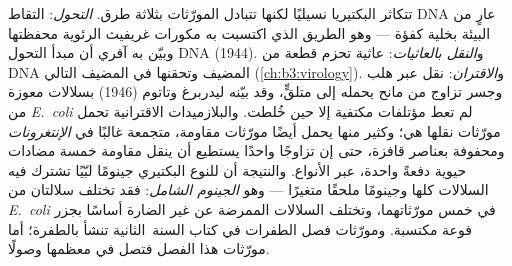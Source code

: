 \begin{definition}\label{def:b3:bacteriology:hgt}
تتكاثر البكتيريا نسيليًا لكنها تتبادل المورّثات بثلاثة طرق.
\emph{التحول}: التقاط DNA عارٍ من البيئة بخلية
كفؤة --- وهو الطريق الذي اكتسبت به مكورات غريفيث الرئوية
محفظتها وبيّن به آفري أن مبدأ التحول DNA
(1944). و\emph{النقل بالعاثيات}: عاثية تحزم قطعة من DNA المضيف
وتحقنها في المضيف التالي (\cref{ch:b3:virology}).
و\emph{الاقتران}: نقل  عبر هلب وجسر
تزاوج من مانح يحمله إلى متلقٍّ، وقد بيّنه
ليدربرغ وتاتوم (1946) بسلالات معوزة من \emph{E.~coli}
لم تعط مؤتلفات مكتفية إلا حين خُلطت. والبلازميدات
الاقترانية تحمل مورّثات نقلها هي؛ وكثير منها يحمل أيضًا مورّثات
مقاومة، متجمعة غالبًا في \emph{الإنتغرونات} ومحفوفة بعناصر قافزة،
حتى إن تزاوجًا واحدًا يستطيع أن ينقل مقاومة خمسة مضادات حيوية
دفعةً واحدة، عبر الأنواع. والنتيجة أن للنوع البكتيري
جينومًا لبّيًا تشترك فيه السلالات كلها وجينومًا ملحقًا
متغيرًا --- وهو \emph{الجينوم الشامل}: فقد تختلف سلالتان من \emph{E.~coli} في
خمس مورّثاتهما، وتختلف السلالات الممرضة عن غير الضارة
أساسًا بجزر فوعة مكتسبة. ومورّثات
فصل الطفرات في كتاب السنة~الثانية تنشأ بالطفرة؛ أما مورّثات هذا
الفصل فتصل في معظمها وصولًا.
\end{definition}

